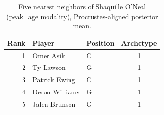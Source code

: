 \begin{table}[htbp]
  \centering\small
  \begin{tabular}{rllc}
    \toprule
    Rank & Player & Position & Archetype \\
    \midrule
    1 & Omer Asik & C & 1 \\
    2 & Ty Lawson & G & 1 \\
    3 & Patrick Ewing & C & 1 \\
    4 & Deron Williams & G & 1 \\
    5 & Jalen Brunson & G & 1 \\
    \bottomrule
  \end{tabular}
  \caption{Five nearest neighbors of Shaquille O'Neal (peak_age modality), Procrustes-aligned posterior mean.}
  \label{tab:Shaquille_O_Neal_neighbors_peak_age}
\end{table}

